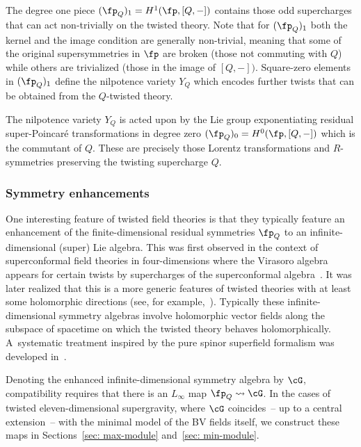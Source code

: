 \documentclass[10pt,a4paper]{amsart}
\numberwithin{equation}{section}
\theoremstyle{definition}
\begin{document}
The degree one piece $(\fp_Q)_1 = H^{1}(\fp , [Q,-])$ contains those odd supercharges that can act non-trivially on the twisted theory. Note that for $(\fp_Q)_1$ both the kernel and the image condition are generally non-trivial, meaning that some of the original supersymmetries in $\fp$ are broken (those not commuting with $Q$) while others are trivialized (those in the image of $[Q,-])$. Square-zero elements in $(\fp_Q)_1$ define the nilpotence variety $Y_{Q}$ which encodes further twists that can be obtained from the $Q$-twisted theory.

The nilpotence variety $Y_{Q}$ is acted upon by the Lie group exponentiating residual super-Poincar\'e transformations in degree zero $(\fp_Q)_0 = H^0(\fp, [Q,-])$ which is the commutant of $Q$. These are precisely those Lorentz transformations and $R$-symmetries preserving the twisting supercharge $Q$.

\subsubsection{Symmetry enhancements}
One interesting feature of twisted field theories is that they typically feature an enhancement of the finite-dimensional residual symmetries $\fp_Q$ to an infinite-dimensional (super) Lie algebra. This was first observed in the context of superconformal field theories in four-dimensions where the Virasoro algebra appears for certain twists by supercharges of the superconformal algebra~\cite{Beem:2013sza}. It was later realized that this is a more generic features of twisted theories with at least some holomorphic directions (see, for example,~\cite{Bomans:2023mkd, Garner:2023wrc, RSW, RW,SCA}). Typically these infinite-dimensional symmetry algebras involve holomorphic vector fields along the subspace of spacetime on which the twisted theory behaves holomorphically. A~systematic treatment inspired by the pure spinor superfield formalism was developed in~\cite{LSCA}.

Denoting the enhanced infinite-dimensional symmetry algebra by $\cG$, compatibility requires that there is an $L_\infty$ map
$\fp_Q \rightsquigarrow \cG $.
In the cases of twisted eleven-dimensional supergravity, where $\cG$ coincides~-- up to a central extension~-- with the minimal model of the BV fields itself, we construct these maps in Sections~\ref{sec: max-module} and~\ref{sec: min-module}.
\end{document}
